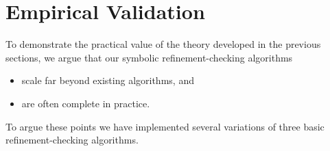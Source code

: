 
\section{Empirical Validation}
\label{sec:exp}

To demonstrate the practical value of the theory developed in the previous
sections, we argue that our symbolic refinement-checking algorithms
\begin{itemize}

  \item scale far beyond existing algorithms, and

  \item are often complete in practice.

\end{itemize}
To argue these points we have implemented several variations of three basic
refinement-checking algorithms.

